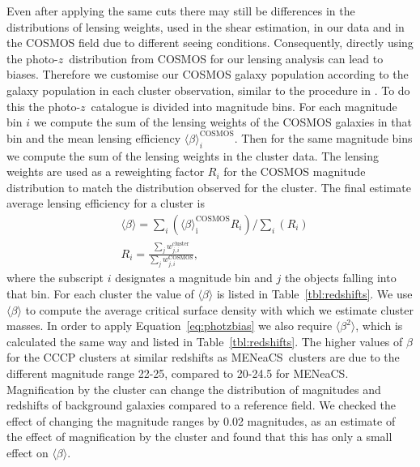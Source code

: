 \documentclass[useAMS,usenatbib]{mnras}
\newcommand{\mn}{MENeaCS}
\newcommand{\pz}{photo-$z$}
\begin{document}
Even after applying the same cuts there may still be differences in the distributions of lensing weights, used in the shear estimation, in our data and in the COSMOS field due to different seeing conditions. Consequently, directly using the \pz \ distribution from COSMOS for our lensing analysis can lead to biases. Therefore we customise our COSMOS galaxy population according to the galaxy population in each cluster observation, similar to the procedure in .
To do this the \pz \ catalogue is divided into magnitude bins. For each magnitude bin $i$ we compute the sum of the lensing weights of the COSMOS galaxies in that bin and the mean lensing efficiency $\langle \beta \rangle^\mathrm{COSMOS}_i$. Then for the same magnitude bins we compute the sum of the lensing weights in the cluster data. The lensing weights are used as a reweighting factor $R_i$ for the COSMOS magnitude distribution to match the distribution observed for the cluster. The final estimate average lensing efficiency for a cluster is  
 \begin{align}
 & \langle \beta \rangle = \sum_i \left( \langle \beta \rangle^\mathrm{COSMOS}_\mathrm{i} R_i \right) / \sum_i  \left( R_i \right) \nonumber \\
 & R_i =  \frac{\sum_j w^\mathrm{cluster}_{j,i} }{ \sum_j w^\mathrm{COSMOS}_{j,i}} ,
 \end{align}
where the subscript $i$ designates a magnitude bin and $j$ the objects falling into that bin.
For each cluster the value of $\langle \beta \rangle$ is listed in Table~\ref{tbl:redshifts}. We use $\langle \beta \rangle$ to compute the average critical surface density with which we estimate cluster masses. In order to apply Equation~\ref{eq:photzbias} we also require  $\langle \beta^2 \rangle$, which is calculated the same way and listed in Table~\ref{tbl:redshifts}. The higher values of $\beta$ for the CCCP clusters at similar redshifts as \mn \ clusters are due to the different magnitude range 22-25, compared to 20-24.5 for \mn. Magnification by the cluster can change the distribution of magnitudes and redshifts of background galaxies compared to a reference field. We checked the effect of changing the magnitude ranges by 0.02 magnitudes, as an estimate of the effect of magnification by the cluster and found that this has only a small effect on $\langle \beta \rangle$.
\end{document}
